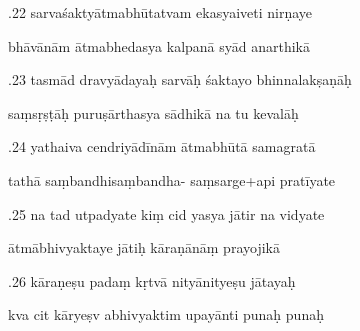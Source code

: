 \documentclass[article,12pt,a4paper]{memoir}%
\newcounter{parCount}
\begin{document}
	  
	  \pstart {}.22 sarvaśaktyātmabhūtatvam ekasyaiveti nirṇaye 
	{}
	\pend%
      

	  
	  \pstart \leavevmode%
	bhāvānām ātmabhedasya kalpanā syād anarthikā 
	{}
	\pend%
      

	  
	  \pstart {}.23 tasmād dravyādayaḥ sarvāḥ śaktayo bhinnalakṣaṇāḥ 
	{}
	\pend%
      

	  
	  \pstart \leavevmode%
	saṃsṛṣṭāḥ puruṣārthasya sādhikā na tu kevalāḥ 
	{}
	\pend%
      

	  
	  \pstart {}.24 yathaiva cendriyādīnām ātmabhūtā samagratā 
	{}
	\pend%
      

	  
	  \pstart \leavevmode%
	tathā saṃbandhisaṃbandha- saṃsarge+api pratīyate 
	{}
	\pend%
      

	  
	  \pstart {}.25 na tad utpadyate kiṃ cid yasya jātir na vidyate 
	{}
	\pend%
      

	  
	  \pstart \leavevmode%
	ātmābhivyaktaye jātiḥ kāraṇānāṃ prayojikā 
	{}
	\pend%
      

	  
	  \pstart {}.26 kāraṇeṣu padaṃ kṛtvā nityānityeṣu jātayaḥ 
	{}
	\pend%
      

	  
	  \pstart \leavevmode%
	kva cit kāryeṣv abhivyaktim upayānti punaḥ punaḥ 
	{}
	\pend%
      
\end{document}
